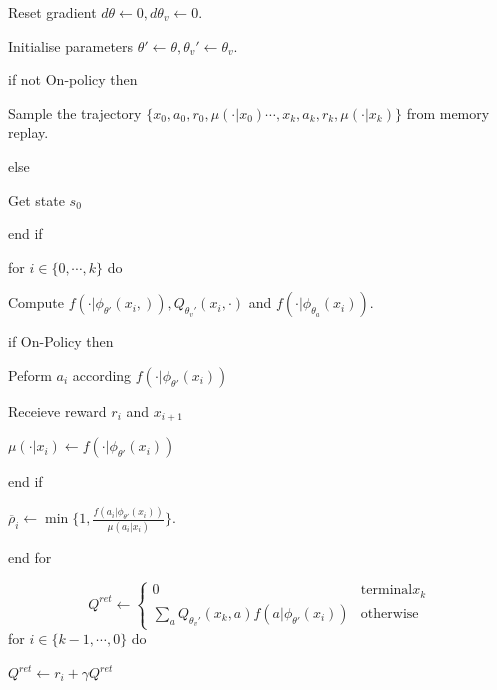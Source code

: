 \documentclass[11pt,a4paper]{article}
\def\bar{\overline}
\begin{document}
\begin{tcolorbox}[title=ACER for discrete actions]
Reset gradient $d\theta \leftarrow 0, d\theta_v \leftarrow 0$. \par 
Initialise parameters $\theta' \leftarrow \theta, \theta_v' \leftarrow \theta_v$. \par 
if not On-policy then \par 
\hspace{1cm} Sample the trajectory $\{x_0, a_0, r_0, \mu(\cdot|x_0) \cdots, x_k, a_k, r_k, \mu(\cdot|x_k)\}$ from memory replay. \par 
else \par 
\hspace{1cm} Get state $s_0$ \par 
end if \par 
for $i \in \{0, \cdots, k\}$ do \par 
\hspace{1cm} Compute $f(\cdot|\phi_{\theta'}(x_i,)), Q_{\theta_v'}(x_i, \cdot)$ and $f(\cdot|\phi_{\theta_a}(x_i))$.\par 
\hspace{1cm} if On-Policy then \par 
\hspace{2cm} Peform $a_i$ according $f(\cdot|\phi_{\theta'}(x_i))$\par 
\hspace{2cm} Receieve reward $r_i$ and $x_{i+1}$\par 
\hspace{2cm} $\mu(\cdot|x_i) \leftarrow f(\cdot|\phi_{\theta'}(x_i))$ \par 
\hspace{1cm} end if \par 
\hspace{1cm} $\bar{\rho}_i \leftarrow \min\{1, \frac{f(a_i|\phi_{\theta'}(x_i))}{\mu(a_i|x_i)}\}$.\par 
end for \par 
\begin{equation}
Q^{ret} \leftarrow \left\{\begin{array}{cc} 0 & \mathrm{terminal} x_k \\ \sum_a Q_{\theta_v'}(x_k,a)f(a|\phi_{\theta'}(x_i)) & \mathrm{otherwise}\end{array}\right.
\end{equation}
for $i \in \{k-1, \cdots, 0\}$ do \par 
\hspace{1cm} $Q^{ret} \leftarrow r_i + \gamma Q^{ret}$ \par 

\end{tcolorbox}
\end{document}
